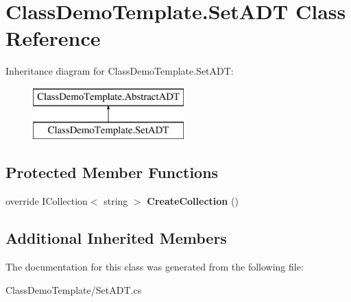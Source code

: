 \hypertarget{class_class_demo_template_1_1_set_a_d_t}{}\section{Class\+Demo\+Template.\+Set\+A\+DT Class Reference}
\label{class_class_demo_template_1_1_set_a_d_t}
Inheritance diagram for Class\+Demo\+Template.\+Set\+A\+DT\+:\begin{figure}[H]
\begin{center}
\leavevmode
\includegraphics[height=2.000000cm]{class_class_demo_template_1_1_set_a_d_t}
\end{center}
\end{figure}
\subsection*{Protected Member Functions}
\begin{DoxyCompactItemize}
\item 
\mbox{\label{class_class_demo_template_1_1_set_a_d_t_a22a0488ab8df9fd83b21ad6112f80487}} 
override I\+Collection$<$ string $>$ {\bfseries Create\+Collection} ()
\end{DoxyCompactItemize}
\subsection*{Additional Inherited Members}


The documentation for this class was generated from the following file\+:\begin{DoxyCompactItemize}
\item 
Class\+Demo\+Template/Set\+A\+D\+T.\+cs\end{DoxyCompactItemize}

